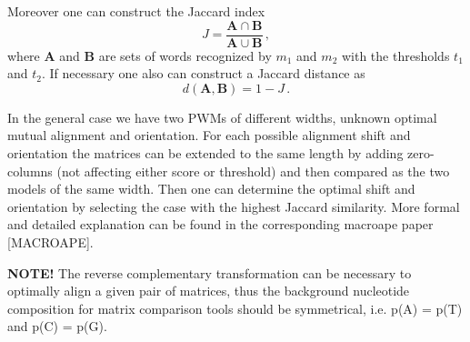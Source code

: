 Moreover one can construct the Jaccard index 
$$J = \frac{\mathbf{A}\cap \mathbf{B}}{\mathbf{A}\cup \mathbf{B}}\,, $$
where $\mathbf{A}$ and $\mathbf{B}$ are 
sets of words recognized by $m_1$ and $m_2$ with the thresholds $t_1$ and $t_2$. If necessary one also can 
construct a Jaccard distance as $$d(\mathbf{A},\mathbf{B}) = 1 - J\,.$$

In the general case we have two PWMs of different widths, unknown optimal mutual 
alignment and orientation. For each possible alignment shift and orientation the matrices can be 
extended to the same length by adding zero-columns (not affecting either score or threshold) 
and then compared as the two models of the same width. Then one can determine the optimal 
shift and orientation by selecting the case with the highest Jaccard similarity. More formal and 
detailed explanation can be found in the corresponding macroape paper [MACROAPE].

\textbf{NOTE!} The reverse complementary transformation can be necessary to optimally align a given pair of matrices,
thus the background nucleotide composition for matrix comparison tools should be symmetrical, i.e. p(A) = p(T) and p(C) = p(G).
